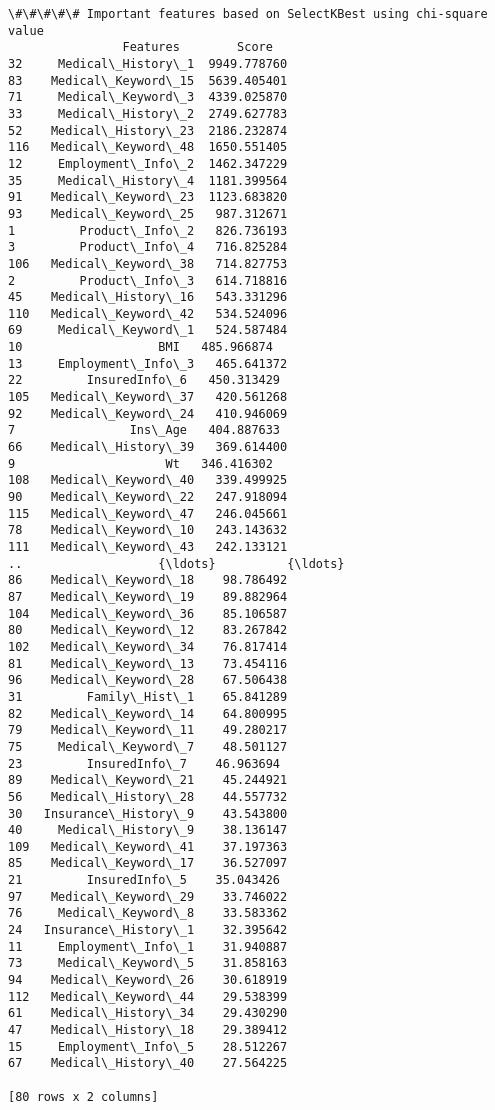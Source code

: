 \documentclass[11pt]{article}
\begin{document}
    \begin{Verbatim}[commandchars=\\\{\}]
\#\#\#\#\# Important features based on SelectKBest using chi-square value
                Features        Score
32     Medical\_History\_1  9949.778760
83    Medical\_Keyword\_15  5639.405401
71     Medical\_Keyword\_3  4339.025870
33     Medical\_History\_2  2749.627783
52    Medical\_History\_23  2186.232874
116   Medical\_Keyword\_48  1650.551405
12     Employment\_Info\_2  1462.347229
35     Medical\_History\_4  1181.399564
91    Medical\_Keyword\_23  1123.683820
93    Medical\_Keyword\_25   987.312671
1         Product\_Info\_2   826.736193
3         Product\_Info\_4   716.825284
106   Medical\_Keyword\_38   714.827753
2         Product\_Info\_3   614.718816
45    Medical\_History\_16   543.331296
110   Medical\_Keyword\_42   534.524096
69     Medical\_Keyword\_1   524.587484
10                   BMI   485.966874
13     Employment\_Info\_3   465.641372
22         InsuredInfo\_6   450.313429
105   Medical\_Keyword\_37   420.561268
92    Medical\_Keyword\_24   410.946069
7                Ins\_Age   404.887633
66    Medical\_History\_39   369.614400
9                     Wt   346.416302
108   Medical\_Keyword\_40   339.499925
90    Medical\_Keyword\_22   247.918094
115   Medical\_Keyword\_47   246.045661
78    Medical\_Keyword\_10   243.143632
111   Medical\_Keyword\_43   242.133121
..                   {\ldots}          {\ldots}
86    Medical\_Keyword\_18    98.786492
87    Medical\_Keyword\_19    89.882964
104   Medical\_Keyword\_36    85.106587
80    Medical\_Keyword\_12    83.267842
102   Medical\_Keyword\_34    76.817414
81    Medical\_Keyword\_13    73.454116
96    Medical\_Keyword\_28    67.506438
31         Family\_Hist\_1    65.841289
82    Medical\_Keyword\_14    64.800995
79    Medical\_Keyword\_11    49.280217
75     Medical\_Keyword\_7    48.501127
23         InsuredInfo\_7    46.963694
89    Medical\_Keyword\_21    45.244921
56    Medical\_History\_28    44.557732
30   Insurance\_History\_9    43.543800
40     Medical\_History\_9    38.136147
109   Medical\_Keyword\_41    37.197363
85    Medical\_Keyword\_17    36.527097
21         InsuredInfo\_5    35.043426
97    Medical\_Keyword\_29    33.746022
76     Medical\_Keyword\_8    33.583362
24   Insurance\_History\_1    32.395642
11     Employment\_Info\_1    31.940887
73     Medical\_Keyword\_5    31.858163
94    Medical\_Keyword\_26    30.618919
112   Medical\_Keyword\_44    29.538399
61    Medical\_History\_34    29.430290
47    Medical\_History\_18    29.389412
15     Employment\_Info\_5    28.512267
67    Medical\_History\_40    27.564225

[80 rows x 2 columns]

    \end{Verbatim}
\end{document}
